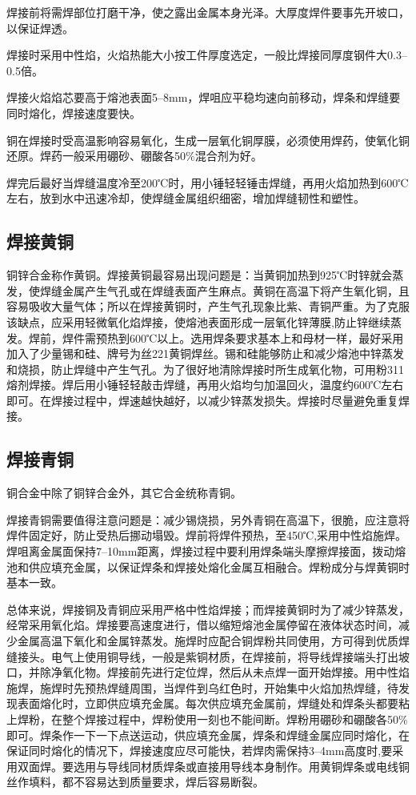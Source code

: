 \documentclass{ctexbook}
\begin{document}
焊接前将需焊部位打磨干净，使之露出金属本身光泽。大厚度焊件要事先开坡口，以保证焊透。

焊接时采用中性焰，火焰热能大小按工件厚度选定，一般比焊接同厚度钢件大0.3--0.5倍。

焊接火焰焰芯要高于熔池表面5--8mm，焊咀应平稳均速向前移动，焊条和焊缝要同时熔化，焊接速度要快。

铜在焊接时受高温影响容易氧化，生成一层氧化铜厚膜，必须使用焊药，使氧化铜还原。焊药一般采用硼砂、硼酸各50\%混合剂为好。

焊完后最好当焊缝温度冷至200℃时，用小锤轻轻锤击焊缝，再用火焰加热到600℃左右，放到水中迅速冷却，使焊缝金属组织细密，增加焊缝韧性和塑性。
\subsection{焊接黄铜}
铜锌合金称作黄铜。焊接黄铜最容易出现问题是：当黄铜加热到925℃时锌就会蒸发，使焊缝金属产生气孔或在焊缝表面产生麻点。黄铜在高温下将产生氧化铜，且容易吸收大量气体；所以在焊接黄铜时，产生气孔现象比紫、青铜严重。为了克服该缺点，应采用轻微氧化焰焊接，使熔池表面形成一层氧化锌薄膜,防止锌继续蒸发。焊前，焊件需预热到600℃以上。选用焊条要求基本上和母材一样，最好采用加入了少量锡和硅、牌号为丝221黄铜焊丝。锡和硅能够防止和减少熔池中锌蒸发和烧损，防止焊缝中产生气孔。为了很好地清除焊接时所生成氧化物，可用粉311熔剂焊接。焊后用小锤轻轻敲击焊缝，再用火焰均匀加温回火，温度约600℃左右即可。在焊接过程中，焊速越快越好，以减少锌蒸发损失。焊接时尽量避免重复焊接。
\subsection{焊接青铜}
铜合金中除了铜锌合金外，其它合金统称青铜。

焊接青铜需要值得注意问题是：减少锡烧损，另外青铜在高温下，很脆，应注意将焊件固定好，防止受热后挪动塌毁。焊前将焊件预热，至450℃,采用中性焰施焊。焊咀离金属面保持7--10mm距离，焊接过程中要利用焊条端头摩擦焊接面，拨动熔池和供应填充金属，以保证焊条和焊接处熔化金属互相融合。焊粉成分与焊黄铜时基本一致。

总体来说，焊接铜及青铜应采用严格中性焰焊接；而焊接黄铜时为了减少锌蒸发，经常采用氧化焰。焊接要高速度进行，借以缩短熔池金属停留在液体状态时间，减少金属高温下氧化和金属锌蒸发。施焊时应配合铜焊粉共同使用，方可得到优质焊缝接头。电气上使用铜导线，一般是紫铜材质，在焊接前，将导线焊接端头打出坡口，并除净氧化物。焊接前先进行定位焊，然后从未点焊一面开始焊接。用中性焰施焊，施焊时先预热焊缝周围，当焊件到乌红色时，开始集中火焰加热焊缝，待发现表面熔化时，立即供应填充金属。每次供应填充金属前，焊缝处和焊条头都要粘上焊粉，在整个焊接过程中，焊粉使用一刻也不能间断。焊粉用硼砂和硼酸各50\%即可。焊条作一下一下点送运动，供应填充金属，焊条和焊缝金属应同时熔化，在保证同时熔化的情况下，焊接速度应尽可能快，若焊肉需保持3--4mm高度时,要采用双面焊。要选用与导线同材质焊条或直接用导线本身制作。用黄铜焊条或电线铜丝作填料，都不容易达到质量要求，焊后容易断裂。
\end{document}

